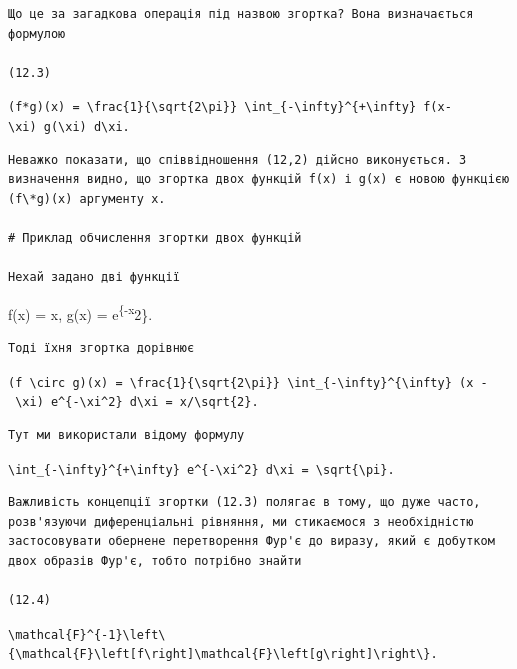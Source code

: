 \documentclass[
  ukrainian,
]{article}
\begin{document}
\begin{verbatim}
Що це за загадкова операція під назвою згортка? Вона визначається формулою

(12.3)
\end{verbatim}

\texttt{(f*g)(x)\ =\ \textbackslash{}frac\{1\}\{\textbackslash{}sqrt\{2\textbackslash{}pi\}\}\ \textbackslash{}int\_\{-\textbackslash{}infty\}\^{}\{+\textbackslash{}infty\}\ f(x-\textbackslash{}xi)\ g(\textbackslash{}xi)\ d\textbackslash{}xi.}

\begin{verbatim}
Неважко показати, що співвідношення (12,2) дійсно виконується. З визначення видно, що згортка двох функцій f(x) і g(x) є новою функцією (f\*g)(x) аргументу x.

# Приклад обчислення згортки двох функцій

Нехай задано дві функції
\end{verbatim}

f(x) = x, g(x) = e\textsuperscript{\{-x}2\}.

\begin{verbatim}
Тоді їхня згортка дорівнює
\end{verbatim}

\texttt{(f\ \textbackslash{}circ\ g)(x)\ =\ \textbackslash{}frac\{1\}\{\textbackslash{}sqrt\{2\textbackslash{}pi\}\}\ \textbackslash{}int\_\{-\textbackslash{}infty\}\^{}\{\textbackslash{}infty\}\ (x\ -\ \textbackslash{}xi)\ e\^{}\{-\textbackslash{}xi\^{}2\}\ d\textbackslash{}xi\ =\ x/\textbackslash{}sqrt\{2\}.}

\begin{verbatim}
Тут ми використали відому формулу
\end{verbatim}

\texttt{\textbackslash{}int\_\{-\textbackslash{}infty\}\^{}\{+\textbackslash{}infty\}\ e\^{}\{-\textbackslash{}xi\^{}2\}\ d\textbackslash{}xi\ =\ \textbackslash{}sqrt\{\textbackslash{}pi\}.}

\begin{verbatim}
Важливість концепції згортки (12.3) полягає в тому, що дуже часто, розв'язуючи диференціальні рівняння, ми стикаємося з необхідністю застосовувати обернене перетворення Фур'є до виразу, який є добутком двох образів Фур'є, тобто потрібно знайти

(12.4)
\end{verbatim}

\texttt{\textbackslash{}mathcal\{F\}\^{}\{-1\}\textbackslash{}left\textbackslash{}\{\textbackslash{}mathcal\{F\}\textbackslash{}left{[}f\textbackslash{}right{]}\textbackslash{}mathcal\{F\}\textbackslash{}left{[}g\textbackslash{}right{]}\textbackslash{}right\textbackslash{}\}.}
\end{document}
